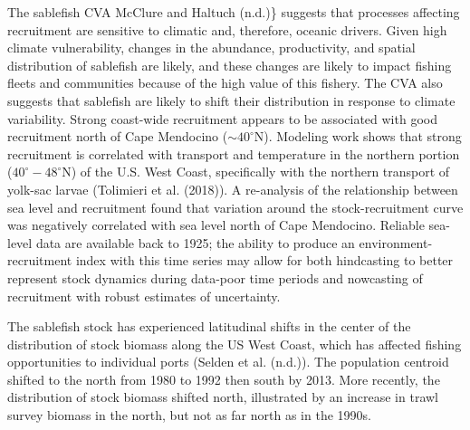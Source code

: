 \documentclass[11pt,
  english,
  a4paper,
]{article}
\begin{document}
\leavevmode\tagmcend\tagstructend\par


The sablefish CVA {McClure and Haltuch (n.d.)\leavevmode\tagmcend\tagstructend}\} suggests that processes affecting recruitment are sensitive to climatic and, therefore, oceanic drivers. Given high climate vulnerability, changes in the abundance, productivity, and spatial distribution of sablefish are likely, and these changes are likely to impact fishing fleets and communities because of the high value of this fishery. The CVA also suggests that sablefish are likely to shift their distribution in response to climate variability. Strong coast-wide recruitment appears to be associated with good recruitment north of Cape Mendocino ({\(\sim 40^{\circ}\)\leavevmode\tagmcend\tagstructend}N). Modeling work shows that strong recruitment is correlated with transport and temperature in the northern portion ({\(40^{\circ}-48^{\circ}\)\leavevmode\tagmcend\tagstructend}N) of the U.S. West Coast, specifically with the northern transport of yolk-sac larvae ({Tolimieri et al. (2018)\leavevmode\tagmcend\tagstructend}). A re-analysis of the relationship between sea level and recruitment found that variation around the stock-recruitment curve was negatively correlated with sea level north of Cape Mendocino. Reliable sea-level data are available back to 1925; the ability to produce an environment-recruitment index with this time series may allow for both hindcasting to better represent stock dynamics during data-poor time periods and nowcasting of recruitment with robust estimates of uncertainty.

\leavevmode\tagmcend\tagstructend\par


The sablefish stock has experienced latitudinal shifts in the center of the distribution of stock biomass along the US West Coast, which has affected fishing opportunities to individual ports ({Selden et al. (n.d.)\leavevmode\tagmcend\tagstructend}). The population centroid shifted to the north from 1980 to 1992 then south by 2013. More recently, the distribution of stock biomass shifted north, illustrated by an increase in trawl survey biomass in the north, but not as far north as in the 1990s.
\end{document}
